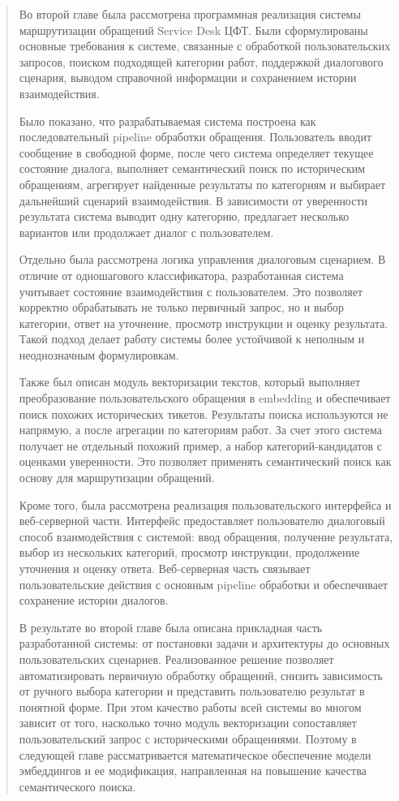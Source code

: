 \begin{quote}
Во второй главе была рассмотрена программная реализация системы
маршрутизации обращений Service Desk ЦФТ. Были сформулированы основные
требования к системе, связанные с обработкой пользовательских запросов,
поиском подходящей категории работ, поддержкой диалогового сценария,
выводом справочной информации и сохранением истории взаимодействия.

Было показано, что разрабатываемая система построена как
последовательный pipeline обработки обращения. Пользователь вводит
сообщение в свободной форме, после чего система определяет текущее
состояние диалога, выполняет семантический поиск по историческим
обращениям, агрегирует найденные результаты по категориям и выбирает
дальнейший сценарий взаимодействия. В зависимости от уверенности
результата система выводит одну категорию, предлагает несколько
вариантов или продолжает диалог с пользователем.

Отдельно была рассмотрена логика управления диалоговым сценарием. В
отличие от одношагового классификатора, разработанная система учитывает
состояние взаимодействия с пользователем. Это позволяет корректно
обрабатывать не только первичный запрос, но и выбор категории, ответ на
уточнение, просмотр инструкции и оценку результата. Такой подход делает
работу системы более устойчивой к неполным и неоднозначным
формулировкам.

Также был описан модуль векторизации текстов, который выполняет
преобразование пользовательского обращения в embedding и обеспечивает
поиск похожих исторических тикетов. Результаты поиска используются не
напрямую, а после агрегации по категориям работ. За счет этого система
получает не отдельный похожий пример, а набор категорий-кандидатов с
оценками уверенности. Это позволяет применять семантический поиск как
основу для маршрутизации обращений.

Кроме того, была рассмотрена реализация пользовательского интерфейса и
веб-серверной части. Интерфейс предоставляет пользователю диалоговый
способ взаимодействия с системой: ввод обращения, получение результата,
выбор из нескольких категорий, просмотр инструкции, продолжение
уточнения и оценку ответа. Веб-серверная часть связывает
пользовательские действия с основным pipeline обработки и обеспечивает
сохранение истории диалогов.

В результате во второй главе была описана прикладная часть разработанной
системы: от постановки задачи и архитектуры до основных пользовательских
сценариев. Реализованное решение позволяет автоматизировать первичную
обработку обращений, снизить зависимость от ручного выбора категории и
представить пользователю результат в понятной форме. При этом качество
работы всей системы во многом зависит от того, насколько точно модуль
векторизации сопоставляет пользовательский запрос с историческими
обращениями. Поэтому в следующей главе рассматривается математическое
обеспечение модели эмбеддингов и ее модификация, направленная на
повышение качества семантического поиска.
\end{quote}


